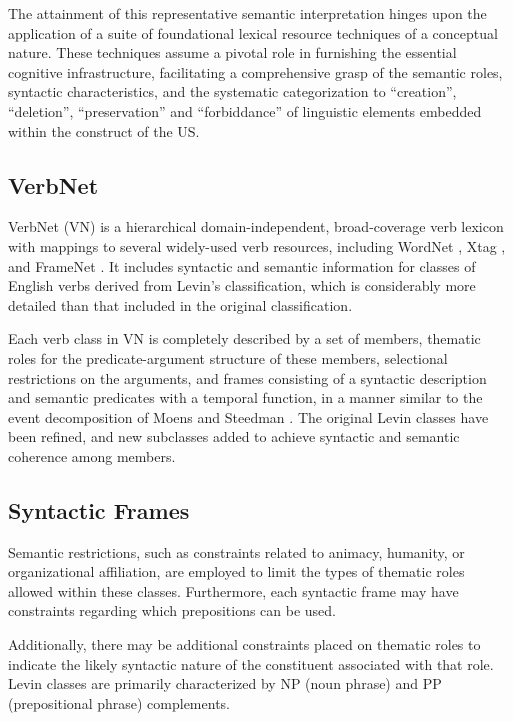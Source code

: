 The attainment of this representative semantic interpretation hinges upon the application of a suite of foundational lexical resource techniques of a conceptual nature. These techniques assume a pivotal role in furnishing the essential cognitive infrastructure, facilitating a comprehensive grasp of the semantic roles, syntactic characteristics, and the systematic categorization to \enquote{creation}, \enquote{deletion}, \enquote{preservation} and \enquote{forbiddance} of linguistic elements embedded within the construct of the US.
\subsection*{VerbNet} \label{verbnet}
VerbNet (VN) is a hierarchical domain-independent, broad-coverage verb lexicon with mappings to several widely-used verb resources, including WordNet \cite{miller1995wordnet}, Xtag \cite{prolo2002generating}, and FrameNet \cite{baker1998berkeley}. It includes syntactic and semantic information for classes of English verbs derived from Levin’s classification, which is considerably more detailed than that included in the original classification. 

Each verb class in VN is completely described by a set of members, thematic roles for the predicate-argument structure of these members, selectional restrictions on the arguments, and frames consisting of a syntactic description and semantic predicates with a temporal function, in a manner similar to the event decomposition of Moens and Steedman \cite{moens2005temporal}. The original Levin classes have been refined, and new subclasses added to achieve syntactic and semantic coherence among members.
\subsection*{Syntactic Frames}
Semantic restrictions, such as constraints related to animacy, humanity, or organizational affiliation, are employed to limit the types of thematic roles allowed within these classes. Furthermore, each syntactic frame may have constraints regarding which prepositions can be used. 

Additionally, there may be additional constraints placed on thematic roles to indicate the likely syntactic nature of the constituent associated with that role.
Levin classes are primarily characterized by NP (noun phrase) and PP (prepositional phrase) complements. 

